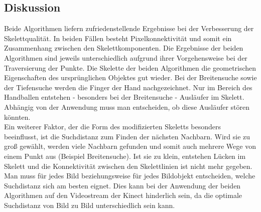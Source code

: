 \subsection{Diskussion}
Beide Algorithmen liefern zufriedenstellende Ergebnisse bei der Verbesserung der Skelettqualität. In beiden
Fällen besteht Pixelkonnektivität und somit ein Zusammenhang zwischen den Skelettkomponenten. Die Ergebnisse
der beiden Algorithmen sind jeweils unterschiedlich aufgrund ihrer Vorgehensweise bei der Traversierung der Punkte. Die Skelette der beiden Algorithmen die geometrischen Eigenschaften des ursprünglichen Objektes gut wieder. Bei der Breitensuche sowie der Tiefensuche werden die Finger der Hand
nachgezeichnet. Nur im Bereich des Handballen entstehen - besonders bei der Breitensuche - Ausläufer im Skelett. Abhängig von der Anwendung muss man entscheiden, ob diese Ausläufer stören könnten.\\
Ein weiterer Faktor, der die Form des modifizierten Skeletts besonders beeinflusst, ist die Suchdistanz zum
Finden der nächsten Nachbarn. Wird sie zu groß gewählt, werden viele Nachbarn gefunden und somit auch
mehrere Wege von einem Punkt aus (Beispiel Breitensuche). Ist sie zu klein, entstehen Lücken im Skelett
und die Konnektivität zwischen den Skelettlinien ist nicht mehr gegeben. Man muss für jedes Bild beziehungsweise für jedes Bildobjekt entscheiden, welche Suchdistanz sich am besten eignet. Dies kann
bei der Anwendung der beiden Algorithmen auf den Videostream der Kinect hinderlich sein, da die optimale Suchdistanz von Bild zu Bild unterschiedlich sein kann.
